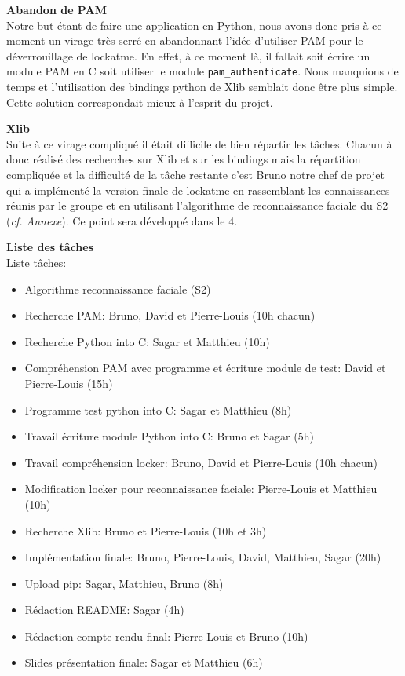 \documentclass[french]{report}
\begin{document}
  \vspace{0.5cm}
\newpage
  \textbf{Abandon de PAM}\\

  Notre but étant de faire une application en Python, nous avons donc pris à ce
  moment un virage très serré en abandonnant l’idée d’utiliser PAM pour le
  déverrouillage de lockatme. En effet, à ce moment là, il fallait soit écrire un
  module PAM en C soit utiliser le module \texttt{pam\_authenticate}. Nous
  manquions de temps et l’utilisation des bindings python de Xlib semblait donc être plus
  simple. Cette solution correspondait mieux à l’esprit du projet.

  \vspace{0.5cm}

  \textbf{Xlib}\\

  Suite à ce virage compliqué il était difficile de bien répartir les tâches.
  Chacun à donc réalisé des recherches sur Xlib et sur les bindings mais la
  répartition compliquée et la difficulté de la tâche restante c’est
  Bruno notre chef de projet qui a implémenté la version finale de lockatme en
  rassemblant les connaissances réunis par le groupe et en utilisant
  l’algorithme de reconnaissance faciale du S2 (\emph{cf. Annexe}).
  Ce point sera développé dans le 4.

  \vspace{0.5cm}

\newpage

\textbf{Liste des tâches}\\

Liste tâches:
  \begin{itemize}[label=\textbullet, font=\normalfont \color{blue}]
  \item{Algorithme reconnaissance faciale (S2)}
  \item{Recherche PAM: Bruno, David et Pierre-Louis (10h chacun)}
  \item{Recherche Python into C: Sagar et Matthieu (10h)}
  \item{Compréhension PAM avec programme et écriture module de test: David et
  Pierre-Louis (15h)}
  \item{Programme test python into C: Sagar et Matthieu (8h)}
  \item{Travail écriture module Python into C: Bruno et Sagar (5h)}
  \item{Travail compréhension locker: Bruno, David et Pierre-Louis (10h chacun)}
  \item{Modification locker pour reconnaissance faciale: Pierre-Louis et Matthieu (10h)}
  \item{Recherche Xlib: Bruno et Pierre-Louis (10h et 3h)}
  \item{Implémentation finale: Bruno, Pierre-Louis, David, Matthieu, Sagar (20h)}
  \item{Upload pip: Sagar, Matthieu, Bruno (8h)}
  \item{Rédaction README: Sagar (4h)}
  \item{Rédaction compte rendu final: Pierre-Louis et Bruno (10h)}
  \item{Slides présentation finale: Sagar et Matthieu (6h)}
\end{itemize}
\end{document}

